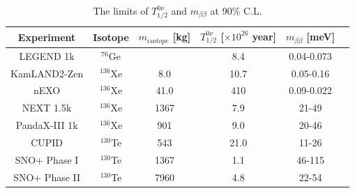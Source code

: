 \begin{table}[ht]
	\caption{\label{newLimits} The limits of $T^{0\nu}_{1/2}$ and $m_{\beta\beta}$ at 90\% C.L.}	
	{\centering
		\begin{tabular*}{135mm}{c@{\extracolsep{\fill}}ccccc}
			\toprule 
			Experiment & Isotope & $m_{isotope}$ [kg] & $T^{0\nu}_{1/2}$ [$\times 10^{26}$ year] & $m_{\beta\beta}$ [meV]\\
			\midrule
			LEGEND 1k & $^{76}$Ge & & 8.4 & 0.04-0.073\\
			KamLAND2-Zen & $^{136}$Xe &8.0 & 10.7 & 0.05-0.16	\\
			nEXO         & $^{136}$Xe &41.0 & 410 & 0.09-0.022  \\
			NEXT 1.5k& $^{136}$Xe& 1367 &  7.9 & 21-49\\
			PandaX-III 1k& $^{136}$Xe & 901& 9.0 & 20-46\\	
			CUPID       & $^{130}$Te& 543 & 21.0 &  11-26 \\
			SNO+ Phase I &$^{130}$Te& 1367  &1.1 & 46-115\\
			SNO+ Phase II &$^{130}$Te& 7960 &4.8 & 22-54\\
			\bottomrule	
		\end{tabular*}
	}
\end{table}
\vspace{1cm}